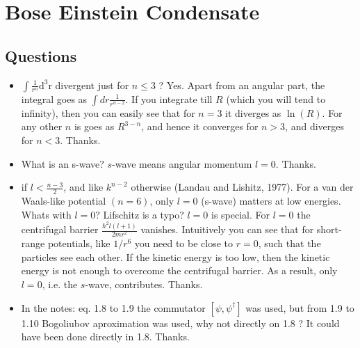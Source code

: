 \section{Bose Einstein Condensate}

\subsection{Questions}
\begin{itemize}
    \item $\int \frac{1}{r^{n}} \mathrm{d^{3}r}$ divergent just for $n \leq 3 $ ?
    {\color{red}
        Yes. Apart from an angular part, the integral goes as $\int dr \frac{1}{r^{n-2}}$. If you integrate  till $R$
        (which you will tend to infinity), then you can easily see that for $n=3$ it diverges as
        $\ln(R)$. For any other $n$ is goes as $R^{3-n}$, and hence it converges for $n>3$, and diverges for $n<3$.
    }
    {\color{green} Thanks.}
        
    \item What is an s-wave?
    {\color{red} $s$-wave means angular momentum $l=0$}.
    {\color{green} Thanks.}

    \item if $l < \frac{n-3}{2}$, and like $k^{n-2}$ otherwise (Landau and Lishitz, 1977). For a van der
    Waals-like potential $(n = 6)$, only $l = 0$ (s-wave) matters at low energies. Whats with $l=0$?
    Lifschitz is a typo?
    {\color{red}
        $l=0$ is special. For $l=0$ the centrifugal barrier $\frac{\hbar^2l(l+1)}{2mr^2}$ vanishes.
        Intuitively you can see that for short-range potentials, like $1/r^6$ you need to
        be close to $r=0$, such that the particles see each other.
        If the kinetic energy is too low, then the kinetic energy is not enough to overcome the centrifugal barrier.
        As a result, only $l=0$, i.e. the $s$-wave, contributes.
    }
    {\color{green} Thanks.}

    \item In the notes: eq. 1.8 to 1.9 the commutator $[\psi, \psi^{\dagger}]$ was used,
        but from 1.9 to 1.10 Bogoliubov aproximation was used, why not directly on 1.8 ?
    {\color{red} It could have been done directly in 1.8.}
    {\color{green} Thanks.}


\end{itemize}
